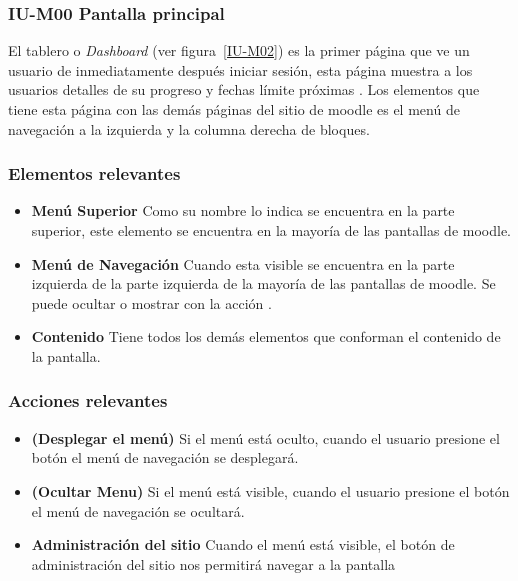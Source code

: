 
\subsubsection{IU-M00 Pantalla principal}

 El tablero o {\it Dashboard} (ver figura~\ref{IU-M02}) es la primer página que ve un usuario de
 inmediatamente después iniciar sesión, esta página muestra a los usuarios detalles de su progreso
 y fechas límite próximas \cite{MoodleTablero} . Los elementos que tiene esta página con las demás
 páginas del sitio de moodle es el menú de navegación a la izquierda y la columna derecha de
 bloques.


\subsubsection{Elementos relevantes}

    \begin{itemize}
    \item
    {\bf Menú Superior}
        Como su nombre lo indica se encuentra en la parte superior, este elemento se
        encuentra en la mayoría de las pantallas de moodle.

    \item
    {\bf Menú de Navegación}
        Cuando esta visible se encuentra en la parte izquierda de la parte izquierda
        de la mayoría de las pantallas de moodle. Se puede ocultar o mostrar con la
        acción \IUMenu[].

    \item
    {\bf Contenido}
        Tiene todos los demás elementos que conforman el contenido de la pantalla.

    \end{itemize}

\subsubsection{Acciones relevantes}

    \begin{itemize}

    \item
    {\bf \IUMenu{} (Desplegar el menú)}
        Si el menú está oculto, cuando el usuario presione el botón \IUMenu{} el menú de
        navegación se desplegará.

    \item {\bf \IUMenu{} (Ocultar Menu)}
        Si el menú está visible, cuando el usuario presione el botón \IUMenu{} el menú de
        navegación se ocultará.

    \item {\bf \IUAdminSitio{} Administración del sitio }
        Cuando el menú está visible, el botón de administración del sitio nos permitirá
        navegar a la pantalla 

    \end{itemize}
